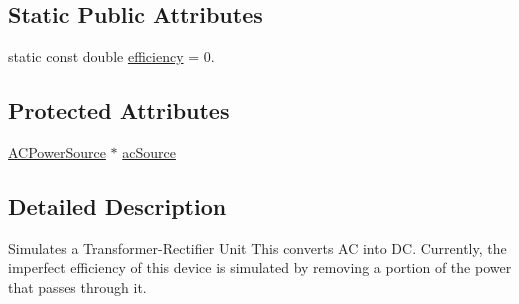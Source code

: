 \subsection*{Static Public Attributes}
\begin{DoxyCompactItemize}
\item 
static const double \hyperlink{class_challenger604_systems_1_1_t_r_u_a1fe9c57208efea35e91dce1cc2342375}{efficiency} = 0.
\end{DoxyCompactItemize}
\subsection*{Protected Attributes}
\begin{DoxyCompactItemize}
\item 
\hyperlink{class_challenger604_systems_1_1_a_c_power_source}{A\-C\-Power\-Source} $\ast$ \hyperlink{class_challenger604_systems_1_1_t_r_u_a501cfc80d8c3cecc892787eca2f0d221}{ac\-Source}
\end{DoxyCompactItemize}


\subsection{Detailed Description}
Simulates a Transformer-\/\-Rectifier Unit This converts A\-C into D\-C. Currently, the imperfect efficiency of this device is simulated by removing a portion of the power that passes through it. 

